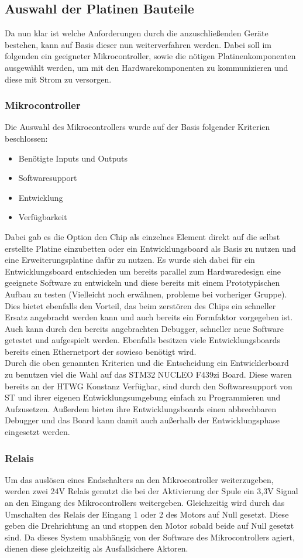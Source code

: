 \subsection{Auswahl der Platinen Bauteile}
Da nun klar ist welche Anforderungen durch die anzuschließenden Geräte bestehen, kann auf Basis dieser nun weiterverfahren werden. Dabei soll im folgenden ein geeigneter Mikrocontroller, sowie die nötigen Platinenkomponenten ausgewählt werden, um mit den Hardwarekomponenten zu kommunizieren und diese mit Strom zu versorgen.
\subsubsection{Mikrocontroller}
Die Auswahl des Mikrocontrollers wurde auf der Basis folgender Kriterien beschlossen:
\begin{itemize}
	\item Benötigte Inputs und Outputs
	\item Softwaresupport 
	\item Entwicklung
	\item Verfügbarkeit
\end{itemize}
Dabei gab es die Option den Chip als einzelnes Element direkt auf die selbst erstellte Platine einzubetten oder ein Entwicklungsboard als Basis zu nutzen und eine Erweiterungsplatine dafür zu nutzen. Es wurde sich dabei für ein Entwicklungsboard entschieden um bereits parallel zum Hardwaredesign eine geeignete Software zu entwickeln und diese bereits mit einem Prototypischen Aufbau zu testen (Vielleicht noch erwähnen, probleme bei vorheriger Gruppe). Dies bietet ebenfalls den Vorteil, das beim zerstören des Chips ein schneller Ersatz angebracht werden kann und auch bereits ein Formfaktor vorgegeben ist. Auch kann durch den bereits angebrachten Debugger, schneller neue Software getestet und aufgespielt werden. Ebenfalls besitzen viele Entwicklungsboards bereits einen Ethernetport der sowieso benötigt wird.\\

\noindent Durch die oben genannten Kriterien und die Entscheidung ein Entwicklerboard zu benutzen viel die Wahl auf das STM32 NUCLEO F439zi Board. Diese waren bereits an der HTWG Konstanz Verfügbar, sind durch den Softwaresupport von ST und ihrer eigenen Entwicklungsumgebung einfach zu Programmieren und Aufzusetzen. Außerdem bieten ihre Entwicklungsboards einen abbrechbaren Debugger und das Board kann damit auch außerhalb der Entwicklungsphase eingesetzt werden.
\subsubsection{Relais}
Um das auslösen eines Endschalters an den Mikrocontroller weiterzugeben, werden zwei 24V Relais genutzt die bei der Aktivierung der Spule ein 3,3V Signal an den Eingang des Mikrocontrollers weitergeben. Gleichzeitig wird durch das Umschalten des Relais der Eingang 1 oder 2 des Motors auf Null gesetzt. Diese geben die Drehrichtung an und stoppen den Motor sobald beide auf Null gesetzt sind. Da dieses System unabhängig von der Software des Mikrocontrollers agiert, dienen diese gleichzeitig als Ausfallsichere Aktoren.
